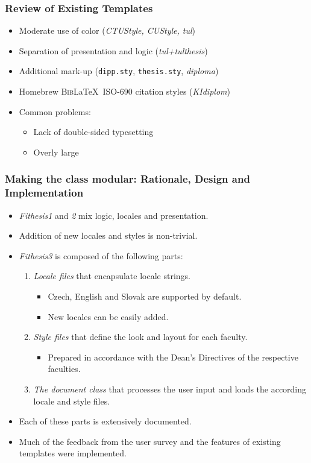 \documentclass[12pt]{beamer}
\begin{document}
  \begin{frame}
    \frametitle{Review of Existing Templates}
    \begin{itemize}[<+->]
      \item Moderate use of color (\emph{CTUStyle, CUStyle, tul})
      \item Separation of presentation and logic (\emph{tul+tulthesis})
      \item Additional mark-up (\texttt{dipp.sty}, \texttt{thesis.sty}, \emph{diploma})
      \item Homebrew \textsc{Bib}\LaTeX\ ISO-690 citation styles (\emph{KIdiplom})
      \item Common problems:
      \begin{itemize}
        \item Lack of double-sided typesetting
        \item Overly large \texttt{\string\textwidth}
      \end{itemize}
    \end{itemize}
  \end{frame}
  \begin{frame}
    \frametitle{Making the class modular: Rationale, Design and Implementation}
    \begin{itemize}[<+->]
      \item \emph{Fithesis1} and \emph{2} mix logic, locales and presentation.
      \item Addition of new locales and styles is non-trivial.
      \item \emph{Fithesis3} is composed of the following parts:\begin{enumerate}
        \item\emph{Locale files} that encapsulate locale strings.
          \begin{itemize}
            \item Czech, English and Slovak are supported by default.
            \item New locales can be easily added.
          \end{itemize}
        \item\emph{Style files} that define the look and layout for each faculty.
          \begin{itemize}
            \item Prepared in accordance with the Dean's Directives of the respective faculties.
          \end{itemize}
        \item\emph{The document class} that processes the user input and loads
          the according locale and style files.
      \end{enumerate}
      \item Each of these parts is extensively documented.
      \item Much of the feedback from the user survey and the features of existing templates were implemented.
    \end{itemize}
  \end{frame}
\end{document}
